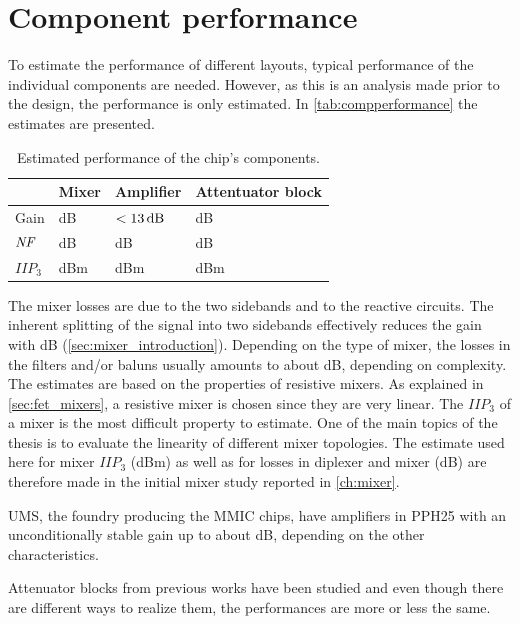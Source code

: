 	\section{Component performance}
		To estimate the performance of different layouts, typical performance of the individual components are needed. However, as this is an analysis made prior to the design, the performance is only estimated. In \autoref{tab:compperformance} the estimates are presented.

		\begin{table}[hbt!]
			\caption[Estimated performance of chip components.]{Estimated performance of the chip's components.}
			\label{tab:compperformance}
			\centering
			\begin{tabular}{ l l l l } \toprule
				& Mixer & Amplifier & Attentuator block \\\midrule
				Gain & \unit[-8]{dB} & $\unit[<13]{dB}$ & \unit[-2--12]{dB} \\
				$\emph{NF}$ & \unit[8]{dB} & \unit[1--2]{dB} & \unit[2--12]{dB} \\
				$IIP_3$ & \unit[20--27]{dBm} & \unit[14--22]{dBm} & \unit[30]{dBm} \\\bottomrule
			\end{tabular}
		\end{table}

		The mixer losses are due to the two sidebands and to the reactive circuits. The inherent splitting of the signal into two sidebands effectively reduces the gain with \unit[3]{dB} (\autoref{sec:mixer_introduction}). Depending on the type of mixer, the losses in the filters and/or baluns usually amounts to about \unit[3--7]{dB}, depending on complexity. The estimates are based on the properties of resistive mixers. As explained in \autoref{sec:fet_mixers}, a resistive mixer is chosen since they are very linear. The $IIP_3$ of a mixer is the most difficult property to estimate. One of the main topics of the thesis is to evaluate the linearity of different mixer topologies. The estimate used here for mixer $IIP_3$ (\unit[25]{dBm}) as well as for losses in diplexer and mixer (\unit[8]{dB}) are therefore made in the initial mixer study reported in \autoref{ch:mixer}.

		UMS, the foundry producing the MMIC chips, have amplifiers in PPH25 with an unconditionally stable gain up to about \unit[13]{dB}, depending on the other characteristics.\autocite{pph25manual}

		Attenuator blocks from previous works have been studied and even though there are different ways to realize them, the performances are more or less the same.\autocite{gustavsson07}

